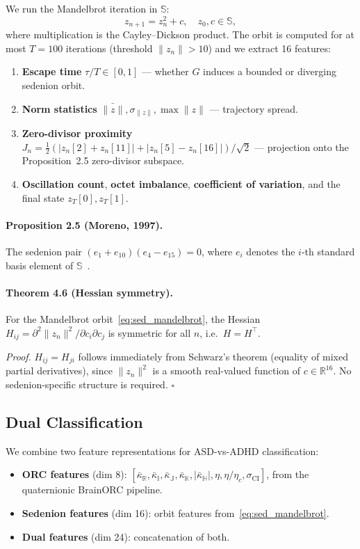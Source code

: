 \documentclass[11pt,a4paper]{article}
\begin{document}
We run the Mandelbrot iteration in $\mathbb{S}$:
\begin{equation}
z_{n+1} = z_n^2 + c, \quad z_0, c \in \mathbb{S},
\label{eq:sed_mandelbrot}
\end{equation}
where multiplication is the Cayley--Dickson product. The orbit is computed for at most $T=100$ iterations (threshold $\|z_n\| > 10$) and we extract 16 features:
\begin{enumerate}
\item \textbf{Escape time} $\tau/T \in [0,1]$ --- whether $G$ induces a bounded or diverging sedenion orbit.
\item \textbf{Norm statistics} $\bar{\|z\|}, \sigma_{\|z\|}, \max\|z\|$ --- trajectory spread.
\item \textbf{Zero-divisor proximity} $J_n = \tfrac{1}{2}(|z_n[2]{+}z_n[11]| + |z_n[5]{-}z_n[16]|)/\sqrt{2}$ --- projection onto the Proposition~2.5 zero-divisor subspace.
\item \textbf{Oscillation count}, \textbf{octet imbalance}, \textbf{coefficient of variation}, and the final state $z_T[0], z_T[1]$.
\end{enumerate}

\paragraph{Proposition 2.5 (Moreno, 1997).}
The sedenion pair $(e_1 + e_{10})(e_4 - e_{15}) = 0$, where $e_i$ denotes the $i$-th standard basis element of $\mathbb{S}$~\cite{moreno1998zero}.

\paragraph{Theorem 4.6 (Hessian symmetry).}
For the Mandelbrot orbit~\eqref{eq:sed_mandelbrot}, the Hessian $H_{ij} = \partial^2 \|z_n\|^2 / \partial c_i \partial c_j$ is symmetric for all $n$, i.e.\ $H = H^\top$.

\textit{Proof.} $H_{ij} = H_{ji}$ follows immediately from Schwarz's theorem (equality of mixed partial derivatives), since $\|z_n\|^2$ is a smooth real-valued function of $c \in \mathbb{R}^{16}$. No sedenion-specific structure is required. $\square$

\subsection{Dual Classification}
\label{sec:dual_class}

We combine two feature representations for ASD-vs-ADHD classification:
\begin{itemize}
\item \textbf{ORC features} (dim 8): $[\bar\kappa_\mathbb{R}, \bar\kappa_\mathbb{I}, \bar\kappa_\mathbb{J}, \bar\kappa_\mathbb{K}, |\bar\kappa_\mathbb{H}|, \eta, \eta/\eta_c, \sigma_\text{CI}]$, from the quaternionic BrainORC pipeline.
\item \textbf{Sedenion features} (dim 16): orbit features from~\eqref{eq:sed_mandelbrot}.
\item \textbf{Dual features} (dim 24): concatenation of both.
\end{itemize}
\end{document}
